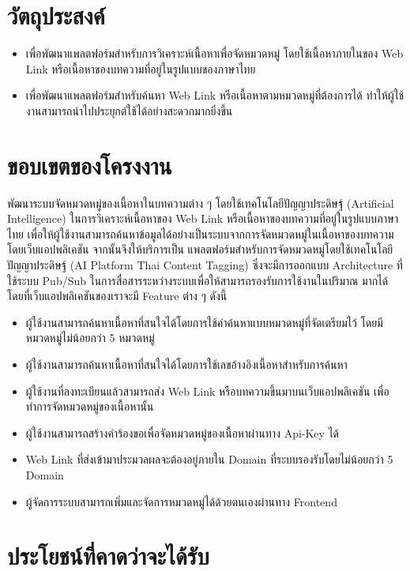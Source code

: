 \documentclass[12pt,oneside,openright,a4paper]{cpe-thai-project}
\begin{document}
\section{วัตถุประสงค์}
  \begin{itemize}
    \item  เพื่อพัฒนาแพลตฟอร์มสำหรับการวิเคราะห์เนื้อหาเพื่อจัดหมวดหมู่ โดยใช้เนื้อหาภายในของ Web Link หรือเนื้อหาของบทความที่อยู่ในรูปแบบของภาษาไทย
    \item  เพื่อพัฒนาแพลตฟอร์มสำหรับค้นหา Web Link หรือเนื้อหาตามหมวดหมู่ที่ต้องการได้ ทำให้ผู้ใช้งานสามารถนำไปประยุกต์ใช้ได้อย่างสะดวกมากยิ่งขึ้น
  \end{itemize}

\section{ขอบเขตของโครงงาน}

  \hspace{1cm}พัฒนาระบบจัดหมวดหมู่ของเนื้อหาในบทความต่าง ๆ โดยใช้เทคโนโลยีปัญญาประดิษฐ์ (Artificial Intelligence) ในการวิเคราะห์เนื้อหาของ Web Link 
  หรือเนื้อหาของบทความที่อยู่ในรูปแบบภาษาไทย เพื่อให้ผู้ใช้งานสามารถค้นหาข้อมูลได้อย่างเป็นระบบจากการจัดหมวดหมู่ในเนื้อหาของบทความโดยเว็บแอปพลิเคชัน จากนั้นจึงให้บริการเป็น
  แพลตฟอร์มสำหรับการจัดหมวดหมู่โดยใช้เทคโนโลยีปัญญาประดิษฐ์ (AI Platform Thai Content Tagging) ซึ่งจะมีการออกแบบ Architecture ที่ใช้ระบบ Pub/Sub ในการสื่อสารระหว่างระบบเพื่อให้สามารถรองรับการใช้งานในปริมาณ
  มากได้ โดยที่เว็บแอปพลิเคชันของเราจะมี Feature ต่าง ๆ ดังนี้
  \begin{itemize}
  \item  ผู้ใช้งานสามารถค้นหาเนื้อหาที่สนใจได้โดยการใช้คำค้นหาแบบหมวดหมู่ที่จัดเตรียมไว้ โดยมีหมวดหมู่ไม่น้อยกว่า 5 หมวดหมู่
  \item  ผู้ใช้งานสามารถค้นหาเนื้อหาที่สนใจได้โดยการใช้เลขอ้างอิงเนื้อหาสำหรับการค้นหา
  \item  ผู้ใช้งานที่ลงทะเบียนแล้วสามารถส่ง Web Link หรือบทความขึ้นมาบนเว็บแอปพลิเคชัน เพื่อทำการจัดหมวดหมู่ของเนื้อหานั้น
  \item  ผู้ใช้งานสามารถสร้างคำร้องขอเพื่อจัดหมวดหมู่ของเนื้อหาผ่านทาง Api-Key ได้ 
  \item  Web Link ที่ส่งเข้ามาประมวลผลจะต้องอยู่ภายใน Domain ที่ระบบรองรับโดยไม่น้อยกว่า 5 Domain
  \item  ผู้จัดการระบบสามารถเพิ่มและจัดการหมวดหมู่ได้ด้วยตนเองผ่านทาง Frontend
  \end{itemize}

\section{ประโยชน์ที่คาดว่าจะได้รับ}
\end{document}
